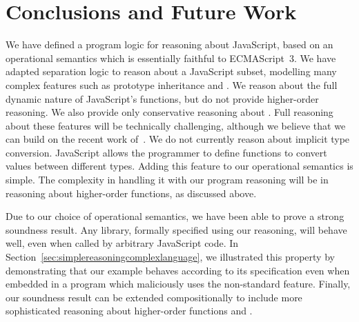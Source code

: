 \documentclass{article}
\begin{document}

















\section{Conclusions and Future Work}\label{sec:conclusions}

We have defined a program logic for reasoning about JavaScript, based
on an operational semantics which is essentially  faithful to 
ECMAScript~3. We have adapted separation logic to reason about
a JavaScript subset, modelling many complex features  such as
 prototype inheritance and . We reason about the full
dynamic nature of JavaScript's functions, but do not provide 
higher-order reasoning. We also provide only conservative reasoning
about . Full reasoning about these features will be
technically challenging, although we believe that we can build on the
recent work of~\cite{billiejoe,Schwinghammer09nestedhoare,DreyerNB10}.
We do not currently reason about implicit type conversion. JavaScript
allows the programmer to define  functions  to convert values between different types. Adding this
feature to our operational semantics is simple. The complexity in
handling it with our program reasoning will be in reasoning about
higher-order functions,  as discussed above.

Due to our choice of operational semantics, we have been able to prove
a strong soundness result. Any library, formally specified 
using our reasoning, 
will behave well, even when called by arbitrary
JavaScript code.
 In Section~\ref{sec:simplereasoningcomplexlanguage},  we
illustrated this property by  demonstrating that our  example behaves
according to its specification even when embedded in a program which
maliciously uses the non-standard  feature.
Finally, our soundness result can be extended
compositionally to include more sophisticated reasoning about
higher-order functions and . 
\end{document}
